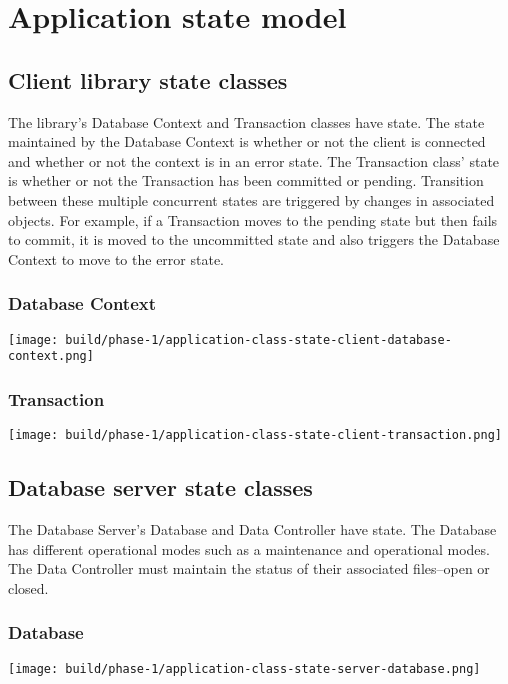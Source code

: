 \documentclass[a4paper]{report}
\begin{document}
\chapter{Application state model}

\section{Client library state classes}

	The library’s Database Context and Transaction classes have state. The state maintained by the Database Context is whether or not the client is connected and whether or not the context is in an error state. The Transaction class’ state is whether or not the Transaction has been committed or pending. Transition between these multiple concurrent states are triggered by changes in associated objects. For example, if a Transaction moves to the pending state but then fails to commit, it is moved to the uncommitted state and also triggers the Database Context to move to the error state.

	\pagebreak

	\subsection{Database Context}
		\texttt{[image: build/phase-1/application-class-state-client-database-context.png]}
	\subsection{Transaction}
		\texttt{[image: build/phase-1/application-class-state-client-transaction.png]}

	\pagebreak

\section{Database server state classes}

	The Database Server’s Database and Data Controller have state. The Database has different operational modes such as a maintenance and operational modes. The Data Controller must maintain the status of their associated files--open or closed.

	\subsection{Database}
		\texttt{[image: build/phase-1/application-class-state-server-database.png]}
\end{document}
